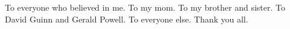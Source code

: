 %
%
%
%
%
%


\newenvironment{dedication}
{
   \cleardoublepage
   \thispagestyle{empty}
   \vspace*{\stretch{1}}
   \hfill\begin{minipage}[t]{1.00\textwidth}
   \raggedright
}
{
   \end{minipage}
   \vspace*{\stretch{3}}
   \clearpage
}

\begin{dedication}
{\large To everyone who believed in me.  To my mom.  To my brother and sister.  To David Guinn and Gerald Powell.  To everyone else.  Thank you all.}
\end{dedication}
